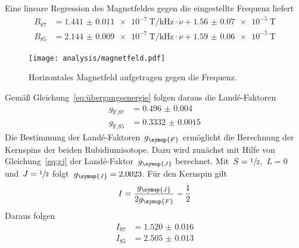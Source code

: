 %
Eine lineare Regression des Magnetfeldes gegen die eingestellte Frequenz liefert
%
\begin{align}
  B_{87}&=\SI{1.441(11)e-7}{\tesla\per\kilo\hertz}\cdot\nu+\SI{1.56(7)e-5}{\tesla} \\
  B_{85}&=\SI{2.144(9)e-7}{\tesla\per\kilo\hertz}\cdot\nu+\SI{1.59(6)e-5}{\tesla}
\end{align}
%
\begin{figure}[htb]
  \centering
  \texttt{[image: analysis/magnetfeld.pdf]}
  \caption{Horizontales Magnetfeld aufgetragen gegen die Frequenz.}
  \label{fig:magnetfeld}
\end{figure}
%
Gemäß Gleichung~\eqref{eq:übergangsenergie} folgen daraus die Landé-Faktoren
%
\begin{align}
  g_{\text{F,87}}&=\num{0.496(4)} \\
  g_{\text{F,85}}&=\num{0.3332(15)}
\end{align}
%
Die Bestimmung der Landé-Faktoren~$g_{\symup{F}}$ ermöglicht die Berechnung der
Kernspins der beiden Rubidiumisotope. Dazu wird zunächst mit Hilfe von
Gleichung~\eqref{eq:gj} der Landé-Faktor~$g_{\symup{J}}$ berechnet.
Mit~$S=\sfrac{1}{2}$,~$L=0$ und~$J=\sfrac{1}{2}$
folgt~$g_{\symup{J}}=\num{2.0023}$. Für den Kernspin gilt
%
\begin{equation*}
  I=\frac{g_{\symup{J}}}{2g_{\symup{F}}}-\frac{1}{2}
\end{equation*}
%
Daraus folgen
%
\begin{align}
  I_{87}&=\num{1.520(16)} \\
  I_{85}&=\num{2.505(13)}
\end{align}

